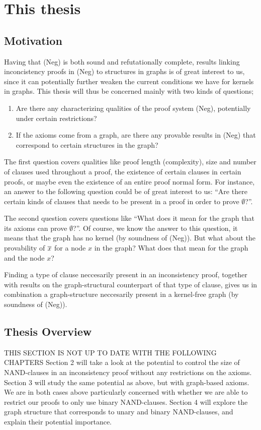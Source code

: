 \section{This thesis}
\label{sec:This thesis}
\subsection{Motivation}
\label{sub:Motivation}
Having that (Neg) is both sound and refutationally complete, results linking inconcistency proofs in (Neg) to structures in graphs is of great interest to us, since it can potentially further weaken the current conditions we have for kernels in graphs.
This thesis will thus be concerned mainly with two kinds of questions;
\begin{enumerate}
  \item Are there any characterizing qualities of the proof system (Neg), potentially under certain restrictions?
  \item If the axioms come from a graph, are there any provable results in (Neg) that correspond to certain structures in the graph?
\end{enumerate}
The first question covers qualities like proof length (complexity), size and number of clauses used throughout a proof, the existence of certain clauses in certain proofs, or maybe even the existence of an entire proof normal form.
For instance, an answer to the following question could be of great interest to us: ``Are there certain kinds of clauses that needs to be present in a proof in order to prove $\emptyset$?''.

The second question covers questions like ``What does it mean for the graph that its axioms can prove $\emptyset$?''.
Of course, we know the answer to this question, it means that the graph has no kernel (by soundness of (Neg)).
But what about the provability of $\overline{x}$ for a node $x$ in the graph?
What does that mean for the graph and the node $x$?

Finding a type of clause neccesarily present in an inconsistency proof, together with results on the graph-structural counterpart of that type of clause, gives us in combination a graph-structure neccesarily present in a kernel-free graph (by soundness of (Neg)).
\subsection{Thesis Overview}
\label{sub:Thesis Overview}
THIS SECTION IS NOT UP TO DATE WITH THE FOLLOWING CHAPTERS
Section 2 will take a look at the potential to control the size of NAND-clauses in an inconsistency proof without any restrictions on the axioms.
Section 3 will study the same potential as above, but with graph-based axioms.
We are in both cases above particularly concerned with whether we are able to restrict our proofs to only use binary NAND-clauses.
Section 4 will explore the graph structure that corresponds to unary and binary NAND-clauses, and explain their potential importance.
